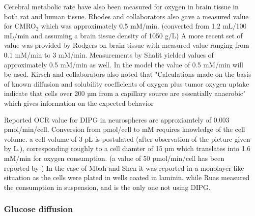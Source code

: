 \documentclass[11pt,a4paper]{article}
\begin{document}
Cerebral metabolic rate have also been measured for oxygen in brain tissue in both rat and human tissue. Rhodes and collaborators also gave a measured value for CMRO$_2$ which was approximately 0.5 mM/min. (converted from 1.2 mL/100 mL/min and assuming a brain tissue density of 1050 g/L) \cite{Rhodes1983} A more recent set of value was provided by Rodgers on brain tissue with measured value ranging from 0.1 mM/min to 3 mM/min. Measurements by Shalit yielded values of approximately 0.5 mM/min as well.\cite{Shalit1972} In the model the value of 0.5 mM/min will be used. Kirsch and collaborators also noted that  "Calculations made on the basis of known diffusion and solubility coefficients of oxygen plus tumor oxygen uptake indicate that cells over 200 µm from a capillary source are essentially anaerobic" which gives information on the expected behavior \cite{Kirsch1978}

Reported OCR value for DIPG in neurospheres are approxiamtely of 0.003 pmol/min/cell.\cite{Shen2019}\cite{Ruas2018} Conversion from pmol/cell to mM requires knowledge of the cell volume. a cell volume of 3 pL is postulated (after observation of the picture given by L.), corresponding roughly to a cell diamter of 15 µm which translates into 1.6 mM/min for oxygen consumption. (a value of 50 pmol/min/cell has been reported by \cite{Mbah2022}) In the case of Mbah and Shen it was reported in  a monolayer-like situation as the cells were plated in wells coated in laminin. while Ruas measured the consumption in suspension, and is the only one not using DIPG.


\subsubsection{Glucose diffusion}%
\end{document}
